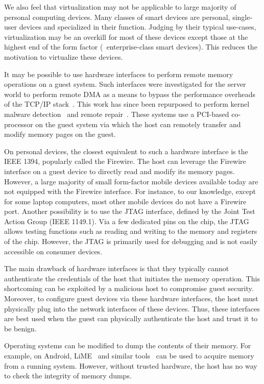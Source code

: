 We also feel that virtualization may not be applicable to large majority of
personal computing devices. Many classes of smart devices are personal,
single-user devices and specialized in their function. Judging by their typical
use-cases, virtualization may be an overkill for most of these devices except
those at the highest end of the form factor (\eg~enterprise-class smart
devices). This reduces the motivation to virtualize these devices.

%
It may be possible to use hardware interfaces to perform remote memory
operations on a guest system. Such interfaces were investigated for the server
world to perform remote DMA as a means to bypass the performance overheads of
the TCP/IP stack~\cite{mellanox,infiniband}. This work has since been
repurposed to perform kernel malware detection~\cite{copilot:sec04} and remote
repair~\cite{backdoor:icac04}. These systems use a PCI-based co-processor on
the guest system via which the host can remotely transfer and modify memory
pages on the guest.

On personal devices, the closest equivalent to such a hardware interface is the
IEEE 1394, popularly called the Firewire. The host can leverage the Firewire
interface on a guest device to directly read and modify its memory pages.
However, a large majority of small form-factor mobile devices available today
are not equipped with the Firewire interface. For instance, to our knowledge,
except for some laptop computers, most other mobile devices do not have a
Firewire port. Another possibility is to use the JTAG interface, defined by the
Joint Test Action Group (IEEE 1149.1). Via a few dedicated pins on the chip,
the JTAG allows testing functions such as reading and writing to the memory and
registers of the chip. However, the JTAG is primarily used for debugging and is
not easily accessible on consumer devices.

The main drawback of hardware interfaces is that they typically
cannot authenticate the credentials of the host that initiates the memory
operation. This shortcoming can be exploited by a malicious host to compromise
guest security. Moreover, to configure guest devices via these hardware
interfaces, the host must physically plug into the network interfaces of these
devices. Thus, these interfaces are best used when the guest can physically
authenticate the host and trust it to be benign.

%
Operating systems can be modified to dump the contents of their memory. For
example, on Android, LiME~\cite{lime} and similar
tools~\cite{dmd,ddms,recoverymode} can be used to acquire memory from a running
system. However, without trusted hardware, the host has no way to check the
integrity of memory dumps.

